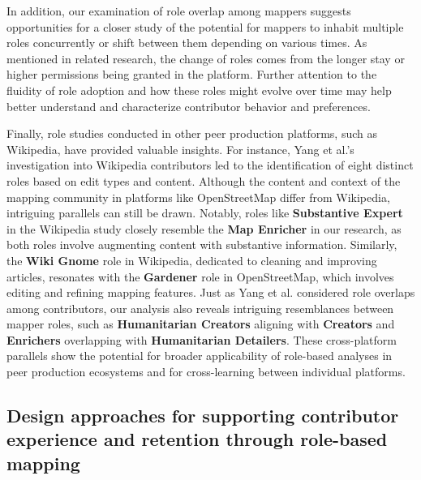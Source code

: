 \documentclass[manuscript,screen,review]{acmart}
\begin{document}
In addition, our examination of role overlap among mappers suggests opportunities for a closer study of the potential for mappers to inhabit multiple roles concurrently or shift between them depending on various times. As mentioned in related research, the change of roles comes from the longer stay \cite{BeginDR18} or higher permissions being granted \cite{Arazy15} in the platform. Further attention to the fluidity of role adoption and how these roles might evolve over time may help better understand and characterize contributor behavior and preferences. 

Finally, role studies conducted in other peer production platforms, such as Wikipedia, have provided valuable insights. For instance, Yang et al.'s\cite{Yang21} investigation into Wikipedia contributors led to the identification of eight distinct roles based on edit types and content. Although the content and context of the mapping community in platforms like OpenStreetMap differ from Wikipedia, intriguing parallels can still be drawn. Notably, roles like \textbf{Substantive Expert} in the Wikipedia study closely resemble the \textbf{Map Enricher} in our research, as both roles involve augmenting content with substantive information. Similarly, the \textbf{Wiki Gnome} role in Wikipedia, dedicated to cleaning and improving articles, resonates with the \textbf{Gardener} role in OpenStreetMap, which involves editing and refining mapping features. Just as Yang et al. considered role overlaps among contributors, our analysis also reveals intriguing resemblances between mapper roles, such as \textbf{Humanitarian Creators} aligning with \textbf{Creators} and \textbf{Enrichers} overlapping with \textbf{Humanitarian Detailers}. These cross-platform parallels show the potential for broader applicability of role-based analyses in peer production ecosystems and for cross-learning between individual platforms.

\subsection{Design approaches for supporting contributor experience and retention through role-based mapping}
\end{document}
